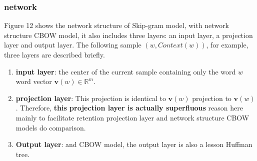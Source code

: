 \subsubsection{network}
Figure 12 shows the network structure of Skip-gram model, with network structure CBOW model, it also includes three layers: an input layer, a projection layer and output layer. The following sample $(w,Context(w))$, for example, three layers are described briefly.
\begin{enumerate}
\item \textbf{input layer}: the center of the current sample containing only the word $w$ word vector $\mathbf{v}(w)\in\mathbb{R}^m$.
\item \textbf{projection layer}: This projection is identical to $\mathbf{v}(w)$ projection to $\mathbf{v}(w)$. Therefore, \textbf{this projection layer is actually superfluous} reason here mainly to facilitate retention projection layer and network structure CBOW models do comparison.
\item \textbf{Output layer}: and CBOW model, the output layer is also a lesson Huffman tree.
\end{enumerate}
